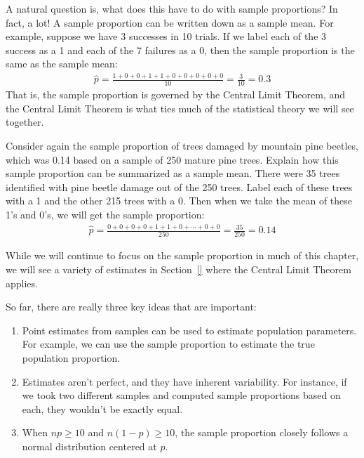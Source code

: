 A natural question is, what does this have to do with sample proportions? In fact, a lot! A sample proportion can be written down as a sample mean. For example, suppose we have 3 successes in 10 trials. If we label each of the 3 success as a 1 and each of the 7 failures as a 0, then the sample proportion is the same as the sample mean:
\begin{align*}
\hat{p}
	= \frac{1 + 0 + 0 + 1 + 1 + 0 + 0 + 0 + 0 + 0}{10}
	= \frac{3}{10}
	= 0.3
\end{align*}
That is, the sample proportion is governed by the Central Limit Theorem, and the Central Limit Theorem is what ties much of the statistical theory we will see together.

\begin{example}{Consider again the sample proportion of trees damaged by mountain pine beetles, which was 0.14 based on a sample of 250 mature pine trees. Explain how this sample proportion can be summarized as a sample mean.}
There were 35 trees identified with pine beetle damage out of the 250 trees. Label each of these trees with a 1 and the other 215 trees with a 0. Then when we take the mean of these 1's and 0's, we will get the sample proportion:
\begin{align*}
\hat{p}
	= \frac{0 + 0 + 0 + 0 + 1 + 1 + 0 + \cdots + 0 + 0}{250}
	= \frac{35}{250}
	= 0.14
\end{align*}
\end{example}


While we will continue to focus on the sample proportion in much of this chapter, we will see a variety of estimates in Section~\ref{} where the Central Limit Theorem applies.


\begin{tipBox}{
So far, there are really three key ideas that are important:
\begin{enumerate}
\setlength{\itemsep}{0mm}
\item Point estimates from samples can be used to estimate population parameters. For example, we can use the sample proportion to estimate the true population proportion.
\item Estimates aren't perfect, and they have inherent variability. For instance, if we took two different samples and computed sample proportions based on each, they wouldn't be exactly equal.
\item When $np \geq 10$ and $n(1-p) \geq 10$, the sample proportion closely follows a normal distribution centered at $p$.
\end{enumerate}}
\end{tipBox}



